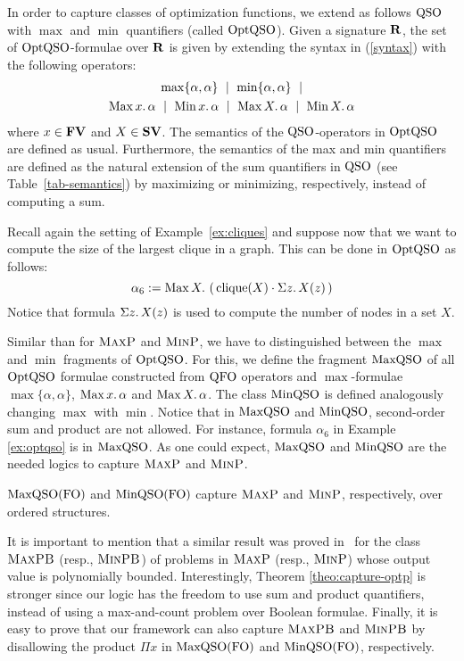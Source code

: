 In order to capture classes of optimization functions, we extend as follows ${\rm QSO}$ with $\max$ and $\min$ quantifiers (called ${\rm OptQSO}$). 
Given a signature $\mathbf{R}$, the set of ${\rm OptQSO}$-formulae over $\mathbf{R}$ is given by extending the syntax in (\ref{syntax}) with the following operators:
\begin{multline*}
\max\{\alpha,\alpha\} \ \mid\ \min\{\alpha,\alpha\} \ \mid \\ \maxa{x} \alpha \ \mid \ \mina{x} \alpha \ \mid \ \maxa{X} \alpha \ \mid \ \mina{X} \alpha 
\end{multline*}
where $x \in \mathbf{FV}$ and $X \in \mathbf{SV}$. The semantics of the ${\rm QSO}$-operators in ${\rm OptQSO}$ are defined as usual. Furthermore, the semantics of the max and min quantifiers are defined as the natural extension of the sum quantifiers in ${\rm QSO}$ (see Table~\ref{tab-semantics}) by maximizing or minimizing, respectively, instead of computing a sum. 
\begin{example}\label{ex:optqso}
	Recall again the setting of Example~\ref{ex:cliques} and suppose now that we want to compute the size of the largest clique in a graph. This can be done in ${\rm OptQSO}$ as follows:
	\[
\alpha_6 := \operatorname{Max}{X}.\, \left( \, \operatorname{clique}(X) \cdot \Sigma{z}.\, X(z)  \, \right)
	\]
	Notice that formula $\Sigma{z}.\, X(z)$ is used to compute the number of nodes in a set $X$. 
\end{example}
Similar than for $\text{\sc MaxP}$ and $\text{\sc MinP}$, we have to distinguished between the $\max$ and $\min$ fragments of ${\rm OptQSO}$. For this, we define the fragment ${\rm MaxQSO}$ of all ${\rm OptQSO}$ formulae constructed from ${\rm QFO}$ operators and $\max$-formulae $\max\{\alpha,\alpha\}$, $\operatorname{Max}{x}.\, \alpha$ and  $\operatorname{Max}{X}.\, \alpha$.
The class ${\rm MinQSO}$ is defined analogously changing $\max$ with $\min$. Notice that in ${\rm MaxQSO}$ and ${\rm MinQSO}$, second-order sum and product are not allowed. For instance, formula $\alpha_6$ in Example \ref{ex:optqso} is in ${\rm MaxQSO}$.
As one could expect, ${\rm MaxQSO}$ and ${\rm MinQSO}$ are the needed logics to capture $\text{\sc MaxP}$ and $\text{\sc MinP}$.
\begin{theorem} \label{theo:capture-optp}
	${\rm MaxQSO}({\rm FO})$ and ${\rm MinQSO}({\rm FO})$ capture $\text{\sc MaxP}$ and $\text{\sc MinP}$, respectively, over ordered structures.
\end{theorem}
It is important to mention that a similar result was proved in~\cite{kolaitis1994logical} for the class $\text{\sc MaxPB}$ (resp., $\text{\sc MinPB}$) of problems in $\text{\sc MaxP}$ (resp., $\text{\sc MinP}$) whose output value is polynomially bounded.
Interestingly, Theorem \ref{theo:capture-optp} is stronger since our logic has the freedom to use sum and product quantifiers, instead of using a max-and-count problem over Boolean formulae. 
Finally, it is easy to prove that our framework can also capture $\text{\sc MaxPB}$ and $\text{\sc MinPB}$ by disallowing the product $\Pi x$ in ${\rm MaxQSO}({\rm FO})$ and ${\rm MinQSO}({\rm FO})$, respectively.

